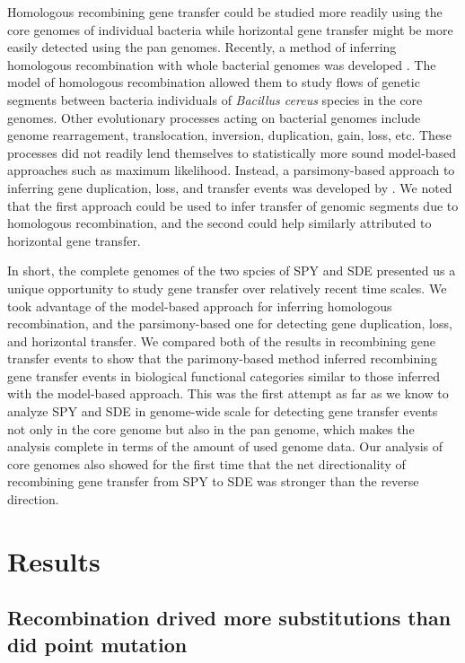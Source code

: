 \documentclass[english]{article}
\begin{document}
Homologous recombining gene transfer could be studied more readily using the
core genomes of individual bacteria while horizontal gene transfer might be more
easily detected using the pan genomes. Recently, a method of inferring
homologous recombination with whole bacterial genomes was developed
\citep{Didelot2010}. The model of homologous recombination allowed them to study
flows of genetic segments between bacteria individuals of \textit{Bacillus
cereus} species in the core genomes.  Other evolutionary processes acting on
bacterial genomes include genome rearragement, translocation, inversion,
duplication, gain, loss, etc.  These processes did not readily lend themselves
to statistically more sound model-based approaches such as maximum likelihood.
Instead, a parsimony-based approach to inferring gene duplication, loss, and
transfer events was developed by \citet{Doyon2011}.  We noted that the first
approach could be used to infer transfer of genomic segments due to homologous
recombination, and the second could help similarly attributed to horizontal gene
transfer. 

In short, the complete genomes of the two spcies of SPY and SDE presented us a
unique opportunity to study gene transfer over relatively recent time scales.
We took advantage of the model-based approach for inferring homologous
recombination, and the parsimony-based one for detecting gene duplication, loss,
and horizontal transfer. We compared both of the results in recombining gene
transfer events to show that the parimony-based method inferred recombining gene
transfer events in biological functional categories similar to those inferred
with the model-based approach. This was the first attempt as far as we know to
analyze SPY and SDE in genome-wide scale for detecting gene transfer events not
only in the core genome but also in the pan genome, which makes the analysis
complete in terms of the amount of used genome data. Our analysis of core
genomes also showed for the first time that the net directionality of
recombining gene transfer from SPY to SDE was stronger than the reverse
direction.

\clearpage{}

\section{Results}

\subsection{Recombination drived more substitutions than did point mutation}
\end{document}
